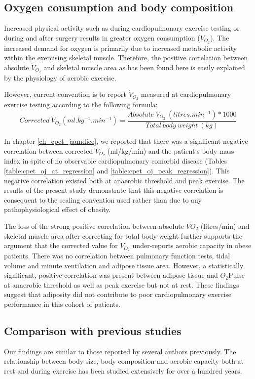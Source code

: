 \subsection{Oxygen consumption and body composition}

Increased physical activity such as during cardiopulmonary exercise testing or during and after surgery results in greater oxygen consumption ($\dot{V}_{O_2}$). 
The increased demand for oxygen is primarily due to increased metabolic activity within the exercising skeletal muscle.
Therefore, the positive correlation between absolute $\dot{V}_{O_2}$ and skeletal muscle area as has been found here is easily explained by the physiology of aerobic exercise. 

However, current convention is to report $\dot{V}_{O_2}$ measured at cardiopulmonary exercise testing according to the following formula: 
\[Corrected\ \dot{V}_{O_2} (ml.kg^{-1}.min^{-1}) = \frac{Absolute\ \dot{V}_{O_2}\ (litres.min^{-1}) * 1000}{Total\ body\ weight\ (kg)}\]

In chapter \ref{ch_cpet_jaundice}, we reported that there was a significant negative correlation between corrected $\dot{V}_{O_2}$ (ml/kg/min) and the patient's body mass index in spite of no observable cardiopulmonary comorbid disease (Tables \ref{table:cpet_oj_at_regression} and \ref{table:cpet_oj_peak_regression}). 
This negative correlation existed both at anaerobic threshold and peak exercise.
The results of the present study demonstrate that this negative correlation is consequent to the scaling convention used rather than due to any pathophysiological effect of obesity. 

The loss of the strong positive correlation between absolute $VO_{2}$ (litres/min) and skeletal muscle area after correcting for total body weight further supports the argument that the corrected value for $\dot{V}_{O_2}$ under-reports aerobic capacity in obese patients. 
There was no correlation between pulmonary function tests, tidal volume and minute ventilation and adipose tissue area. 
However, a statistically significant, positive correlation was present between adipose tissue and $O_2$Pulse at anaerobic threshold as well as peak exercise but not at rest.
These findings suggest that adiposity did not contribute to poor cardiopulmonary exercise performance in this cohort of patients.

\subsection{Comparison with previous studies}
Our findings are similar to those reported by several authors previously. 
The relationship between body size, body composition and aerobic capacity both at rest and during exercise has been studied extensively for over a hundred years.

